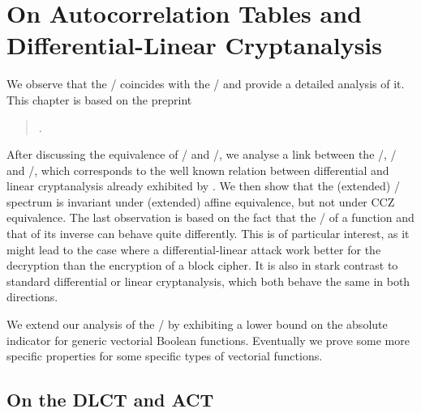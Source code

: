 \chapter{On Autocorrelation Tables and Differential-Linear Cryptanalysis}\label{ch:act}

\hspace{1.5em}
We observe that the \DLCT/ coincides with the \ACT/ and provide a detailed analysis of it.
This chapter is based on the preprint
\begin{quote}
    .
\end{quote}

After discussing the equivalence of \DLCT/ and \ACT/, we analyse a link between the \ACT/, \DDT/ and \LAT/, which corresponds to the well known relation between differential and linear cryptanalysis already exhibited by \textcite{EC:ChaVau94,EC:BloNyb13}.
We then show that the (extended) \ACT/ spectrum is invariant under (extended) affine equivalence, but not under CCZ equivalence.
The last observation is based on the fact that the \ACT/ of a function and that of its inverse can behave quite differently.
This is of particular interest, as it might lead to the case where a differential-linear attack work better for the decryption than the encryption of a block cipher.
It is also in stark contrast to standard differential or linear cryptanalysis, which both behave the same in both directions.

We extend our analysis of the \ACT/ by exhibiting a lower bound on the absolute indicator for generic vectorial Boolean functions.
Eventually we prove some more specific properties for some specific types of vectorial functions.

\section{On the DLCT and ACT}%
\label{sec:act:dlct}

